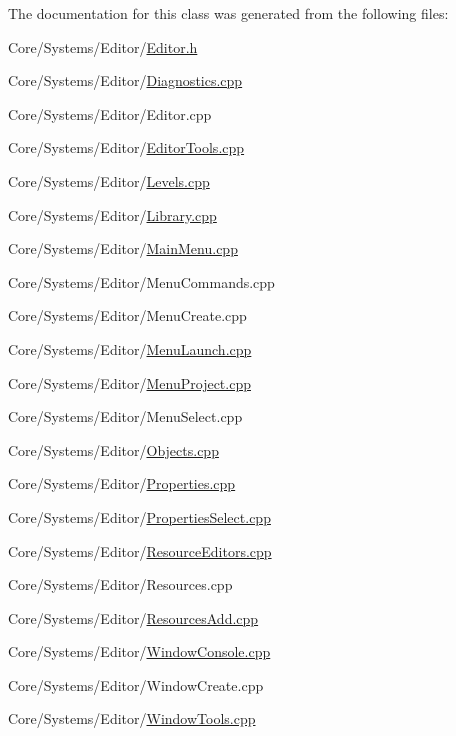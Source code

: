 The documentation for this class was generated from the following files\-:\begin{DoxyCompactItemize}
\item 
Core/\-Systems/\-Editor/\hyperlink{Editor_8h}{Editor.\-h}\item 
Core/\-Systems/\-Editor/\hyperlink{Diagnostics_8cpp}{Diagnostics.\-cpp}\item 
Core/\-Systems/\-Editor/Editor.\-cpp\item 
Core/\-Systems/\-Editor/\hyperlink{EditorTools_8cpp}{Editor\-Tools.\-cpp}\item 
Core/\-Systems/\-Editor/\hyperlink{Levels_8cpp}{Levels.\-cpp}\item 
Core/\-Systems/\-Editor/\hyperlink{Library_8cpp}{Library.\-cpp}\item 
Core/\-Systems/\-Editor/\hyperlink{MainMenu_8cpp}{Main\-Menu.\-cpp}\item 
Core/\-Systems/\-Editor/Menu\-Commands.\-cpp\item 
Core/\-Systems/\-Editor/Menu\-Create.\-cpp\item 
Core/\-Systems/\-Editor/\hyperlink{MenuLaunch_8cpp}{Menu\-Launch.\-cpp}\item 
Core/\-Systems/\-Editor/\hyperlink{MenuProject_8cpp}{Menu\-Project.\-cpp}\item 
Core/\-Systems/\-Editor/Menu\-Select.\-cpp\item 
Core/\-Systems/\-Editor/\hyperlink{Objects_8cpp}{Objects.\-cpp}\item 
Core/\-Systems/\-Editor/\hyperlink{Properties_8cpp}{Properties.\-cpp}\item 
Core/\-Systems/\-Editor/\hyperlink{PropertiesSelect_8cpp}{Properties\-Select.\-cpp}\item 
Core/\-Systems/\-Editor/\hyperlink{ResourceEditors_8cpp}{Resource\-Editors.\-cpp}\item 
Core/\-Systems/\-Editor/Resources.\-cpp\item 
Core/\-Systems/\-Editor/\hyperlink{ResourcesAdd_8cpp}{Resources\-Add.\-cpp}\item 
Core/\-Systems/\-Editor/\hyperlink{WindowConsole_8cpp}{Window\-Console.\-cpp}\item 
Core/\-Systems/\-Editor/Window\-Create.\-cpp\item 
Core/\-Systems/\-Editor/\hyperlink{WindowTools_8cpp}{Window\-Tools.\-cpp}\end{DoxyCompactItemize}
